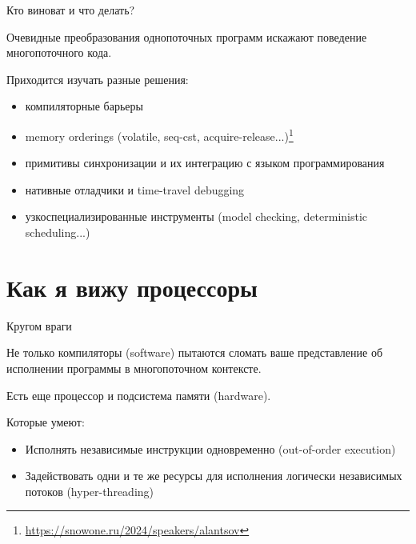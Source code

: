 \begin{frame}{Кто виноват и что делать?}

Очевидные преобразования однопоточных программ искажают поведение многопоточного кода.

\pause

Приходится изучать разные решения:

\pause
\begin{itemize}
	\item компиляторные барьеры
	\pause
  \item memory orderings (volatile, seq-cst, acquire-release...)\footnote<4->{\tiny\url{https://snowone.ru/2024/speakers/alantsov}}
  \pause
	\item примитивы синхронизации и их интеграцию с языком программирования %
	\pause
	\item нативные отладчики и time-travel debugging
	\pause
	\item узкоспециализированные инструменты (model checking, deterministic scheduling...)
\end{itemize}

\end{frame}


% 
% 


\section{Как я вижу процессоры}
\showTOC

\begin{frame}[t]{Кругом враги}

Не только компиляторы (software) пытаются сломать ваше представление об исполнении программы в многопоточном контексте. 

\pause
Есть еще процессор и подсистема памяти (hardware). 

\pause
Которые умеют:
\begin{itemize}
    \pause
    \item Исполнять независимые инструкции одновременно (out-of-order execution)

    \pause
    \item Задействовать одни и те же ресурсы для исполнения логически независимых потоков (hyper-threading)
\end{itemize}
\end{frame}



